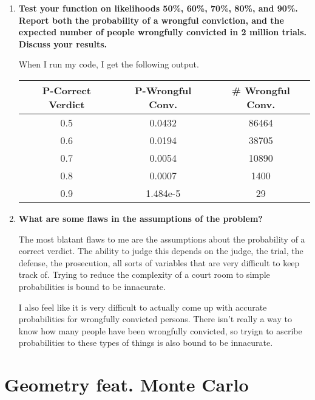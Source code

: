 \documentclass[11pt]{article}
\begin{document}
\begin{enumerate}
        \item \textbf{Test your function on likelihoods 50\%, 60\%, 70\%, 80\%, and 
            90\%. Report both the probability of a wrongful conviction, 
            and the expected number of people wrongfully convicted in 2 
            million trials. Discuss your results.}

            When I run my code, I get the following output.

            \begin{center}
                \begin{tabular}{|| c | c | c ||}
                    \hline
                    P-Correct Verdict   &   P-Wrongful Conv.    &   \# Wrongful Conv. \\
                    \hline\hline
                    0.5 	&	 0.0432 	&	 86464 	\\
                    0.6 	&	 0.0194 	&	 38705 	\\
                    0.7 	&	 0.0054 	&	 10890 	\\
                    0.8 	&	 0.0007 	&	 1400 	\\
                    0.9 	&	 1.484e-5 	&	 29 	\\
                    \hline
                \end{tabular}
            \end{center}
        \item \textbf{What are some flaws in the assumptions of the problem?}

            The most blatant flaws to me are the assumptions about the
            probability of a correct verdict. The ability to judge this depends
            on the judge, the trial, the defense, the prosecution, all sorts of
            variables that are very difficult to keep track of. Trying to
            reduce the complexity of a court room to simple probabilities is
            bound to be innacurate. 

            I also feel like it is very difficult to actually come up with
            accurate probabilities for wrongfully convicted persons. There
            isn't really a way to know how many people have been wrongfully
            convicted, so tryign to ascribe probabilities to these types of
            things is also bound to be innacurate.

    \end{enumerate}

    \section{Geometry feat. Monte Carlo}
\end{document}
